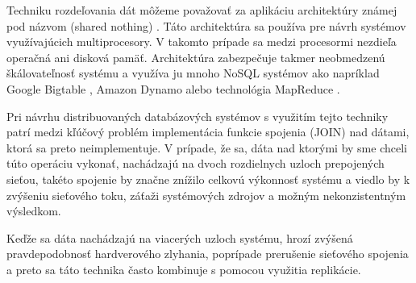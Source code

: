 \documentclass[11pt,twoside,a4paper]{book}
\begin{document}
Techniku rozdeľovania dát môžeme považovať za aplikáciu architektúry známej pod názvom  (shared nothing) \cite{stonebraker1986case}. Táto architektúra sa používa pre návrh systémov využívajúcich multiprocesory. V takomto prípade sa medzi procesormi nezdieľa operačná ani disková pamäť. Architektúra zabezpečuje takmer neobmedzenú škálovateľnosť systému a využíva ju mnoho NoSQL systémov ako napríklad Google Bigtable \cite{chang2008bigtable}, Amazon Dynamo \cite{decandia2007dynamo} alebo technológia MapReduce \cite{dean2008mapreduce}.

Pri návrhu distribuovaných databázových systémov s využitím tejto techniky patrí medzi kľúčový problém implementácia funkcie spojenia (JOIN) nad dátami, ktorá sa preto neimplementuje. V prípade, že sa, dáta nad ktorými by sme chceli túto operáciu vykonať, nachádzajú na dvoch rozdielnych uzloch prepojených sieťou, takéto spojenie by značne znížilo celkovú výkonnosť systému a viedlo by k zvýšeniu sieťového toku, záťaži systémových zdrojov a možným nekonzistentným výsledkom.

Keďže sa dáta nachádzajú na viacerých uzloch systému, hrozí zvýšená pravdepodobnosť hardverového zlyhania, poprípade prerušenie sieťového spojenia a preto sa táto technika často kombinuje s pomocou využitia replikácie.
\end{document}
